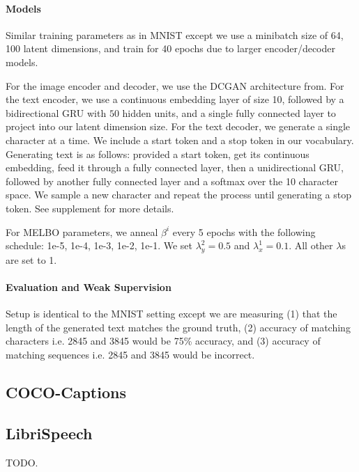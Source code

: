 \documentclass{article}
\begin{document}
\paragraph{Models} Similar training parameters as in MNIST except we use a minibatch size of 64, 100 latent dimensions, and train for 40 epochs due to larger encoder/decoder models.

For the image encoder and decoder, we use the DCGAN architecture from. For the text encoder, we use a continuous embedding layer of size 10, followed by a bidirectional GRU with $50$ hidden units, and a single fully connected layer to project into our latent dimension size. For the text decoder, we generate a single character at a time. We include a start token and a stop token in our vocabulary. Generating text is as follows: provided a start token, get its continuous embedding, feed it through a fully connected layer, then a unidirectional GRU, followed by another fully connected layer and a softmax over the 10 character space. We sample a new character and repeat the process until generating a stop token. See supplement for more details.

For MELBO parameters, we anneal $\beta^{i}$ every 5 epochs with the following schedule: 1e-5, 1e-4, 1e-3, 1e-2, 1e-1. We set $\lambda_{y}^{2} = 0.5$ and $\lambda_{x}^{1} = 0.1$. All other $\lambda$s are set to 1.

\paragraph{Evaluation and Weak Supervision} Setup is identical to the MNIST setting except we are measuring (1) that the length of the generated text matches the ground truth, (2) accuracy of matching characters i.e. 2845 and 3845 would be 75\% accuracy, and (3) accuracy of matching sequences i.e. 2845 and 3845 would be incorrect.

\subsection{COCO-Captions}



\subsection{LibriSpeech}
TODO.


{\small
\linespread{1}

}
\end{document}

